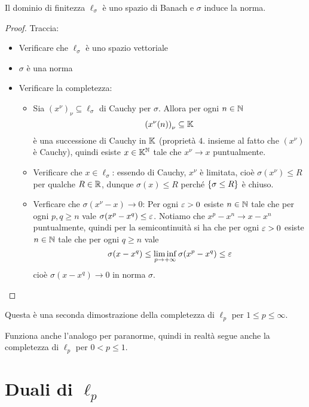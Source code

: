 \begin{exercise}
Il dominio di finitezza $\ell_\sigma$ \`e uno spazio di Banach e $\sigma$ induce la norma.
\end{exercise}
\begin{proof}
Traccia:
\begin{itemize}
    \item Verificare che $\ell_\sigma$ \`e uno spazio vettoriale
    \item $\sigma$ \`e una norma
    \item Verificare la completezza: 
    \begin{itemize}
        \item Sia $(x^\nu)_\nu\subseteq \ell_\sigma$ di Cauchy per $\sigma$. Allora per ogni $n\in\mathbb{N}$
        \[\left({x^\nu(n)}\right)_\nu\subseteq \mathbb{K}\]
        \`e una successione di Cauchy in $\mathbb{K}$ (propriet\`a $4.$ insieme al fatto che $(x^\nu)$ \`e Cauchy), quindi esiste $x\in\mathbb{K}^{\mathbb{N}}$ tale che $x^\nu\to x$ puntualmente.
        \item Verificare che $x\in\ell_\sigma$: essendo di Cauchy, $x^\nu$ \`e limitata, cio\`e $\sigma(x^\nu)\leq R$ per qualche $R\in \mathbb{R}$, dunque $\sigma(x)\leq R$ perch\'e $\left\{{\sigma\leq R}\right\}$ \`e chiuso.
        \item Verficare che $\sigma(x^\nu-x)\to 0$: Per ogni $\varepsilon>0$ esiste $n\in\mathbb{N}$ tale che per ogni $p,q\geq n$ vale $\sigma(x^p-x^q)\leq \varepsilon$. Notiamo che $x^p-x^n\to x-x^n$ puntualmente, quindi per la semicontinuit\`a si ha che per ogni $\varepsilon>0$ esiste $n\in\mathbb{N}$ tale che per ogni $q\geq n$ vale
        \[\sigma(x-x^q)\leq\liminf_{p\to +\infty}\sigma(x^p-x^q)\leq  \varepsilon\]
        cio\`e $\sigma(x-x^q)\to 0$ in norma $\sigma$.
    \end{itemize}
\end{itemize}
\end{proof}

\begin{remark}
Questa \`e una seconda dimostrazione della completezza di $\ell_p$ per $1\leq p\leq \infty$.
\end{remark}

\begin{remark}
Funziona anche l'analogo per paranorme, quindi in realt\`a segue anche la completezza di $\ell_p$ per $0<p\leq 1$.
\end{remark}




\section{Duali di \texorpdfstring{$\ell_p$}{lp}}

